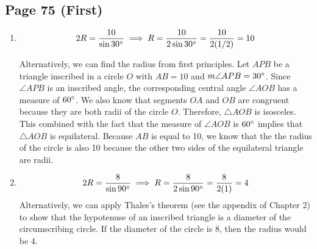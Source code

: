 \documentclass{article}
\newenvironment{solutions}[1]
{\subsection*{#1}
 \begin{enumerate}[leftmargin=1.5em]}
{\end{enumerate}}
\newcommand{\solution}{\item}
\begin{document}
\begin{solutions}{Page 75 (First)}
\solution %
\[
2R = \dfrac{10}{\sin{30\degree}} \implies R = \dfrac{10}{2\sin{30\degree}} = \dfrac{10}{2(1/2)} = 10
\]

\begin{center}
\end{center}

Alternatively, we can find the radius from first principles. Let $APB$ be a triangle inscribed in a circle $O$ with $AB=10$ and $m\angle{APB}=30\degree$. Since $\angle{APB}$ is an inscribed angle, the corresponding central angle $\angle{AOB}$ has a measure of $60\degree$. We also know that segments $OA$ and $OB$ are congruent because they are both radii of the circle $O$. Therefore, $\triangle{AOB}$ is isosceles. This combined with the fact that the measure of $\angle{AOB}$ is $60\degree$ implies that $\triangle{AOB}$ is equilateral. Because $AB$ is equal to 10, we know that the the radius of the circle is also 10 because the other two sides of the equilateral triangle are radii.

\solution %
\[
2R = \dfrac{8}{\sin{90\degree}} \implies R = \dfrac{8}{2\sin{90\degree}} = \dfrac{8}{2(1)} = 4
\]
Alternatively, we can apply Thales's theorem (see the appendix of Chapter 2) to show that the hypotenuse of an inscribed triangle is a diameter of the circumscribing circle. If the diameter of the circle is 8, then the radius would be 4.
\end{solutions}
\end{document}
